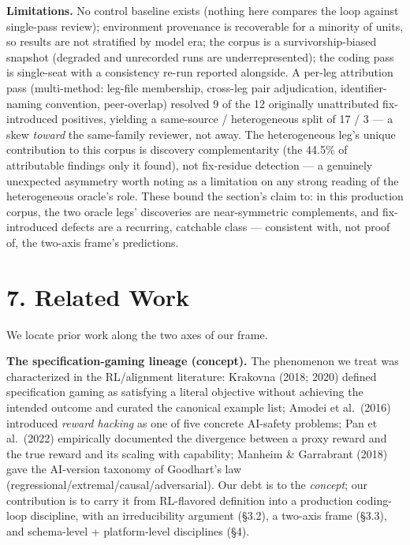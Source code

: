 \documentclass[
  11pt,
]{article}
\begin{document}
\textbf{Limitations.} No control baseline exists (nothing here compares
the loop against single-pass review); environment provenance is
recoverable for a minority of units, so results are not stratified by
model era; the corpus is a survivorship-biased snapshot (degraded and
unrecorded runs are underrepresented); the coding pass is single-seat
with a consistency re-run reported alongside. A per-leg attribution pass
(multi-method: leg-file membership, cross-leg pair adjudication,
identifier-naming convention, peer-overlap) resolved 9 of the 12
originally unattributed fix-introduced positives, yielding a same-source
/ heterogeneous split of 17 / 3 --- a skew \emph{toward} the same-family
reviewer, not away. The heterogeneous leg's unique contribution to this
corpus is discovery complementarity (the 44.5\% of attributable findings
only it found), not fix-residue detection --- a genuinely unexpected
asymmetry worth noting as a limitation on any strong reading of the
heterogeneous oracle's role. These bound the section's claim to: in this
production corpus, the two oracle legs' discoveries are near-symmetric
complements, and fix-introduced defects are a recurring, catchable class
--- consistent with, not proof of, the two-axis frame's predictions.

\section{7. Related Work}\label{related-work}

We locate prior work along the two axes of our frame.

\textbf{The specification-gaming lineage (concept).} The phenomenon we
treat was characterized in the RL/alignment literature: Krakovna (2018;
2020) defined specification gaming as satisfying a literal objective
without achieving the intended outcome and curated the canonical example
list; Amodei et al.~(2016) introduced \emph{reward hacking} as one of
five concrete AI-safety problems; Pan et al.~(2022) empirically
documented the divergence between a proxy reward and the true reward and
its scaling with capability; Manheim \& Garrabrant (2018) gave the
AI-version taxonomy of Goodhart's law
(regressional/extremal/causal/adversarial). Our debt is to the
\emph{concept}; our contribution is to carry it from RL-flavored
definition into a production coding-loop discipline, with an
irreducibility argument (§3.2), a two-axis frame (§3.3), and
schema-level + platform-level disciplines (§4).
\end{document}
